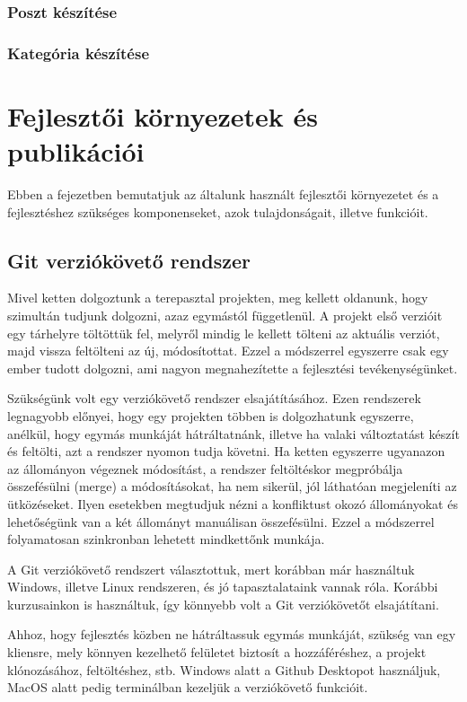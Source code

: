\documentclass[
]{thesis-ekf}
\theoremstyle{definition}
\theoremstyle{remark}
\begin{document}
		\subsection{Poszt készítése}
		\subsection{Kategória készítése}
		

\chapter{Fejlesztői környezetek és publikációi}
	\par Ebben a fejezetben bemutatjuk az általunk használt fejlesztői környezetet és a fejlesztéshez szükséges komponenseket, azok tulajdonságait, illetve funkcióit.
	\section{Git verziókövető rendszer}
	Mivel ketten dolgoztunk a terepasztal projekten, meg kellett oldanunk, hogy szimultán tudjunk dolgozni, azaz egymástól függetlenül. A projekt első verzióit egy tárhelyre töltöttük fel, melyről mindig le kellett tölteni az aktuális verziót, majd vissza feltölteni az új, módosítottat. Ezzel a módszerrel egyszerre csak egy ember tudott dolgozni, ami nagyon megnahezítette a fejlesztési tevékenységünket.
	\par Szükségünk volt egy verziókövető rendszer elsajátításához. Ezen rendszerek legnagyobb előnyei, hogy egy projekten többen is dolgozhatunk egyszerre, anélkül, hogy egymás munkáját hátráltatnánk, illetve ha valaki változtatást készít és feltölti, azt a rendszer nyomon tudja követni. Ha ketten egyszerre ugyanazon az állományon végeznek módosítást, a rendszer feltöltéskor megpróbálja összefésülni (merge) a módosításokat, ha nem sikerül, jól láthatóan megjeleníti az ütközéseket. Ilyen esetekben megtudjuk nézni a konfliktust okozó állományokat és lehetőségünk van a két állományt manuálisan összefésülni. Ezzel a módszerrel folyamatosan szinkronban lehetett mindkettőnk munkája.
	\par A Git verziókövető rendszert választottuk, mert korábban már használtuk Windows, illetve Linux rendszeren, és jó tapasztalataink vannak róla. Korábbi kurzusainkon is használtuk, így könnyebb volt a Git verziókövetőt elsajátítani. 
	\par Ahhoz, hogy fejlesztés közben ne hátráltassuk egymás munkáját, szükség van egy kliensre, mely könnyen kezelhető felületet biztosít a hozzáféréshez, a projekt klónozásához, feltöltéshez, stb. Windows alatt a Github Desktopot használjuk, MacOS alatt pedig terminálban kezeljük a verziókövető funkcióit.
\end{document}
